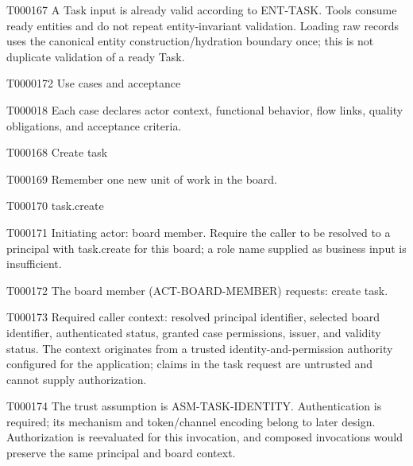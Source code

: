 \documentclass[11pt,a4paper]{article}
\begin{document}
\begin{atlasparagraph}{T000167}
A Task input is already valid according to ENT-TASK. Tools consume ready entities and do not repeat entity-invariant validation. Loading raw records uses the canonical entity construction/hydration boundary once; this is not duplicate validation of a ready Task.
\end{atlasparagraph}
\begin{atlasheading}{T000017}{2}
Use cases and acceptance
\end{atlasheading}
\begin{atlasparagraph}{T000018}
Each case declares actor context, functional behavior, flow links, quality obligations, and acceptance criteria.
\end{atlasparagraph}
\begin{atlastext}{T000168}
Create task
\end{atlastext}
\begin{atlasparagraph}{T000169}
Remember one new unit of work in the board.
\end{atlasparagraph}
\begin{atlastext}{T000170}
task.create
\end{atlastext}
\begin{atlasparagraph}{T000171}
Initiating actor: board member. Require the caller to be resolved to a principal with task.create for this board; a role name supplied as business input is insufficient.
\end{atlasparagraph}
\begin{atlasparagraph}{T000172}
The board member (ACT-BOARD-MEMBER) requests: create task.
\end{atlasparagraph}
\begin{atlasparagraph}{T000173}
Required caller context: resolved principal identifier, selected board identifier, authenticated status, granted case permissions, issuer, and validity status. The context originates from a trusted identity-and-permission authority configured for the application; claims in the task request are untrusted and cannot supply authorization.
\end{atlasparagraph}
\begin{atlasparagraph}{T000174}
The trust assumption is ASM-TASK-IDENTITY. Authentication is required; its mechanism and token/channel encoding belong to later design. Authorization is reevaluated for this invocation, and composed invocations would preserve the same principal and board context.
\end{atlasparagraph}
\end{document}
